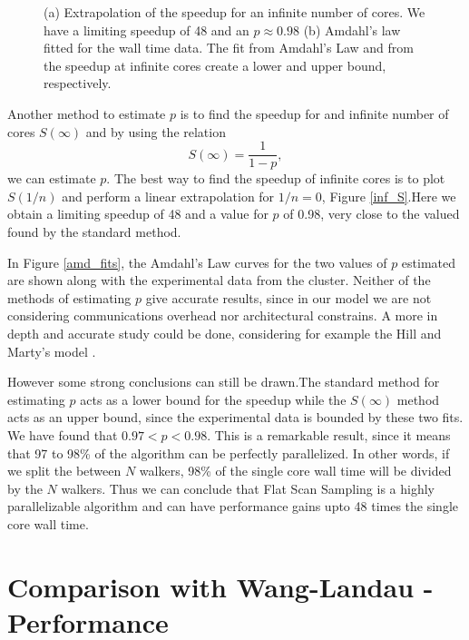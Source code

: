 \begin{figure}[h]
	\centering
	\caption{(a) Extrapolation of the speedup for an infinite number of cores. We have a limiting speedup of 48 and an $p \approx 0.98$ (b) Amdahl's law fitted for the wall time data. The fit from Amdahl's Law and from the speedup at infinite cores create a lower and upper bound, respectively.}
\end{figure}


	Another method to estimate $p$ is to find the speedup for and infinite number of cores $S(\infty)$ and by using the relation
\begin{equation}
	S(\infty) = \frac{1}{1-p},
\end{equation}
we can estimate $p$. The best way to find the speedup of infinite cores is to plot $S(1/n)$ and perform a linear extrapolation for $1/n=0$, Figure \ref{inf_S}.Here we obtain a limiting speedup of 48 and a value for $p$ of 0.98, very close to the valued found by the standard method.

	In Figure \ref{amd_fits}, the Amdahl's Law curves for the two values of $p$ estimated are shown along with the experimental data from the cluster. Neither of the methods of estimating $p$ give accurate results, since in our model we are not considering communications overhead nor architectural constrains. A more in depth and accurate study could be done, considering for example the Hill and Marty's model \cite{Hill2008}.  

	However some strong conclusions can still be drawn.The standard method for estimating $p$ acts as a lower bound for the speedup while the $S(\infty)$ method acts as an upper bound, since the experimental data is bounded by these two fits. We have found that $0.97<p<0.98$. This is a remarkable result, since it means that 97 to 98\% of the algorithm can be perfectly parallelized. In other words, if we split the between $N$ walkers, 98\% of the single core wall time will be divided by the $N$ walkers. Thus we can conclude that Flat Scan Sampling is a highly parallelizable algorithm and can have performance gains upto 48 times the single core wall time.

\section{Comparison with Wang-Landau - Performance}

